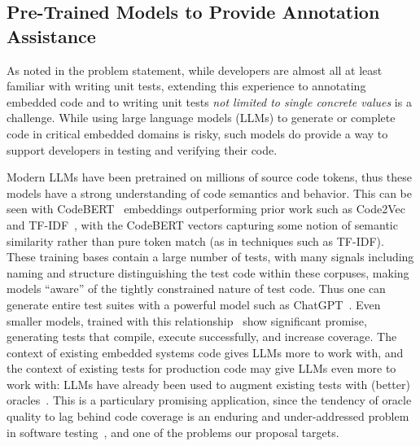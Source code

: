 
\subsection{Pre-Trained Models to Provide Annotation Assistance}

As noted in the problem statement, while developers are almost all at
least familiar with writing unit tests, extending this experience to
annotating embedded code and to writing unit tests \emph{not limited
  to single concrete values} is a challenge.  While using large
language models (LLMs) to generate or complete code in critical
embedded domains is risky, such models do provide a way to support
developers in testing and verifying their code.

Modern LLMs have been pretrained on millions of source code tokens, thus these models have a strong understanding of code semantics 
and behavior. This can be seen with CodeBERT~\cite{codebert} embeddings outperforming prior work such as Code2Vec~\cite{code2vec} 
and TF-IDF~\cite{tfidf}, with the CodeBERT vectors capturing some
notion of semantic similarity rather than pure token match (as in techniques 
such as TF-IDF).  These training bases contain a large number of
tests, with many signals including naming and structure distinguishing
the test code within these corpuses, making
models ``aware'' of the tightly constrained nature of test code.
Thus one can generate entire test suites with a powerful model such as ChatGPT~\cite{gpttestgen, siddiq2023empirical}. 
Even smaller models, trained with this relationship~\cite{catlm, starcoder} show significant promise, generating tests that compile, execute successfully, and 
increase coverage.  The context of existing embedded systems code gives LLMs more to work with,
and the context of existing tests for production code may give LLMs
even more to work with: LLMs have already been used to augment existing tests
with (better) oracles~\cite{OracleGEN}.  This is a particulary promising
application, since the tendency of oracle quality to lag behind code coverage
is an enduring and under-addressed problem in software
testing~\cite{MindGap}, and one of the problems our proposal targets.

